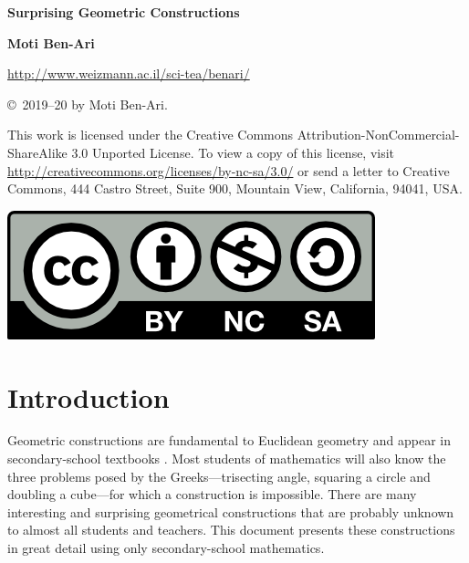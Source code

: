 
\thispagestyle{empty}

\begin{center}
\textbf{\LARGE Surprising Geometric Constructions}

\bigskip
\bigskip
\bigskip
\bigskip

\textbf{\Large Moti Ben-Ari}

\bigskip
\bigskip

\url{http://www.weizmann.ac.il/sci-tea/benari/}
\end{center}
\vfill

\begin{footnotesize}
\begin{center}
\copyright{}\ 2019--20 by Moti Ben-Ari.
\end{center}

This work is licensed under the Creative Commons Attribution-NonCommercial-ShareAlike 3.0 Unported License. To view a copy of this license, visit \url{http://creativecommons.org/licenses/by-nc-sa/3.0/} or send a letter to Creative Commons, 444 Castro Street, Suite 900, Mountain View, California, 94041, USA.
\end{footnotesize}

\bigskip

\begin{center}
\includegraphics[width=.15\textwidth]{by-nc-sa.png}
\end{center}

\newpage
\thispagestyle{empty}
\mbox{}
\newpage
\thispagestyle{empty}

\tableofcontents
\newpage
\mbox{}
\newpage


\chapter{Introduction}

Geometric constructions are fundamental to Euclidean geometry and appear in secondary-school textbooks \cite{geometry}. Most students of mathematics will also know the three problems posed by the Greeks---trisecting angle, squaring a circle and doubling a cube---for which a construction is impossible. There are many interesting and surprising geometrical constructions that are probably unknown to almost all students and teachers. This document presents these constructions in great detail using only secondary-school mathematics.

